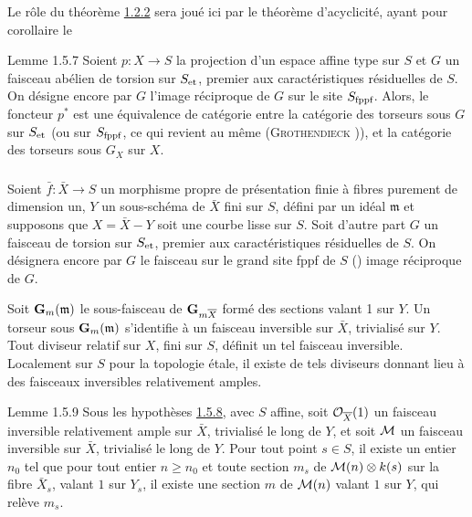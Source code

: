 \documentclass[10pt]{../fichiers-configuration-latex/smfart}
\begin{document}
Le rôle du théorème \hyperref[XVIII.thm1.2.2]{1.2.2} sera joué ici par le théorème
d'acyclicité\pageoriginale {}, ayant pour corollaire le

\begin{enonce*}{Lemme 1.5.7}
Soient $p:X\rightarrow S$ la projection d'un espace affine type sur
$S$ et $G$ un faisceau abélien de torsion sur $S_{\text{\rm et}}$,
premier aux caractéristiques résiduelles de $S$. On désigne encore par
$G$ l'image réciproque de $G$ sur le site $S_{\text{\rm
fppf}}$. Alors, le foncteur $p^{\ast}$ est une équivalence de
catégorie entre la catégorie des torseurs sous $G$ sur $S_{\text{\rm
et}}$ (ou sur $S_{\text{\rm fppf}}$, ce qui revient au même
{(\textsc{Grothendieck} \cite[Corollaire~11.9]{SGA4-18:2})}), et la catégorie des torseurs sous $G_{X}$
sur $X$.
\end{enonce*}

\setcounter{subsubsection}{7}
\subsubsection{}
Soient $\bar{f}:\bar{X}\rightarrow S$ un morphisme propre de
présentation finie à fibres purement de dimension un, $Y$ un
sous-schéma de $\bar{X}$ fini sur $S$, défini par un idéal $\mathfrak{m}$ et
supposons que $X=\bar{X}-Y$ soit une courbe lisse sur $S$. Soit
d'autre part $G$ un faisceau de torsion sur $S_{\text{\rm et}}$,
premier aux caractéristiques résiduelles de $S$. On désignera encore
par $G$ le faisceau sur le grand site fppf de $S$ () image
réciproque de $G$.

Soit $\mathbf{G}_{m}(\mathfrak{m})$ le sous-faisceau de $\mathbf{G}_{m\overline{X}}$
formé des sections valant 1 sur $Y$. Un torseur sous
$\mathbf{G}_{m}(\mathfrak{m})$ s'identifie à un faisceau inversible sur $\bar{X}$,
trivialisé sur $Y$. Tout diviseur relatif sur $X$, fini sur $S$,
définit un tel faisceau inversible. Localement sur $S$ pour la
topologie étale, il existe de tels diviseurs donnant lieu à des
faisceaux inversibles relativement amples.

\begin{enonce*}{Lemme 1.5.9}
Sous les hypothèses \hyperref[XVIII.subsubsec1.5.8]{1.5.8}, avec $S$ affine,
soit ${\mathcal O}_{\overline{X}}(1)$ un faisceau inversible relativement ample sur
$\bar{X}$, trivialisé le long de $Y$, et soit ${\mathcal M}$ un
faisceau inversible sur $\bar{X}$, trivialisé le long de $Y$. Pour
tout point $s\in S$, il existe un entier $n_{0}$ tel que pour tout
entier $n\geq n_{0}$ et toute section $m_{s}$ de
${\mathcal M}(n)\otimes k(s)$ sur la fibre $\bar{X}_{s}$, valant $1$
sur $Y_{s}$, il existe une section $m$ de ${\mathcal M}(n)$ valant $1$
sur $Y$, qui relève $m_{s}$.
\end{enonce*}
\end{document}

